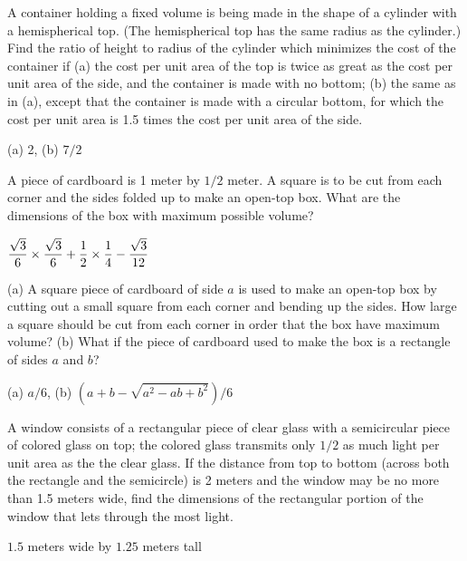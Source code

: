 \begin{exercises}
\begin{exercise}
A container holding a fixed volume is being made in the shape of a cylinder
with a hemispherical top.  (The hemispherical top has the same radius
as the cylinder.)  Find the ratio of height to radius of the cylinder which
minimizes the cost of the container if (a) the cost per unit area of the
top is twice as great as the cost per unit area of the side, and the
container is made with no bottom; (b) the same as in (a), except that the
container is made with a circular bottom, for which the cost per unit area is
1.5 times the cost per unit area of the side.
\begin{answer} (a) 2, (b) $7/2$
\end{answer}\end{exercise}

\begin{exercise} A piece of cardboard is 1 meter by $1/2$ meter. A square is
to be cut from each corner and the sides folded up to make an open-top
box. What are the dimensions of the box with maximum possible volume?
\begin{answer} $\displaystyle{\sqrt3\over6}\times{\sqrt3\over6}+{1\over2}\times
{1\over4}-{\sqrt3\over 12}$
\end{answer}\end{exercise}


\begin{exercise} (a) A square piece of cardboard of side $a$ is used to make
an open-top box by cutting out a small square from each corner and
bending up the sides.  How large a square should be cut from each
corner in order that the box have maximum volume? (b) What if the
piece of cardboard used to make the box is a rectangle of sides $a$
and $b$?  
\begin{answer} (a) $a/6$, (b) $(a+b-\sqrt{a^2-ab+b^2})/6$
\end{answer}\end{exercise} 
\label{exercise: cardboard box}

\begin{exercise} A window consists of a rectangular piece of clear glass with
a semicircular piece of colored glass on top; the
colored glass transmits only $1/2$ as much light per unit area as the
the clear glass.  If the distance from
top to bottom (across both the rectangle and the semicircle) is
2 meters and the window may be no more than 1.5 meters wide, find the
dimensions of the rectangular portion of the window that lets through
the most light.
\begin{answer} $1.5$ meters wide by $1.25$ meters tall
\end{answer}\end{exercise} 


\end{exercises}
